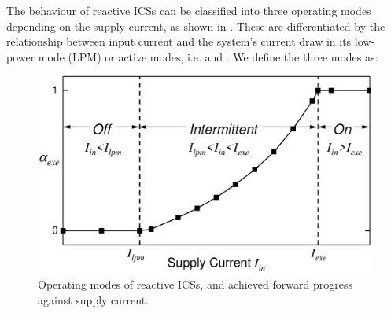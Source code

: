 The behaviour of reactive ICSs can be classified into three operating modes depending on the supply current, as shown in . These are differentiated by the relationship between input current  and the system's current draw in its low-power mode (LPM) or active modes, i.e.  and . We define the three modes as:

\begin{figure}[!t]
    \centering
    \includegraphics[width=0.9\columnwidth]{ch3_sizingeffect/figures/OperatingMode0Fig}
    \caption{Operating modes of reactive ICSs, and achieved forward progress against supply current.}
    \label{fig:operatingModes}
\end{figure}

